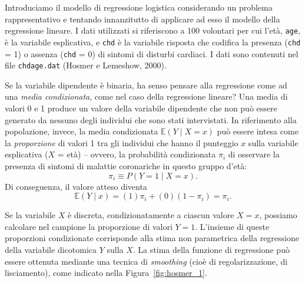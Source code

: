 Introduciamo il modello di regressione logistica considerando un problema rappresentativo e tentando innanzitutto di applicare ad esso il modello della regressione lineare.  
I dati utilizzati si riferiscono a 100 volontari per cui l'età, \texttt{age}, è la variabile esplicativa, e \texttt{chd} è la variabile risposta che codifica la presenza (\texttt{chd} = 1) o assenza (\texttt{chd} = 0) di sintomi di disturbi cardiaci. 
I dati sono contenuti nel file \texttt{chdage.dat} (Hosmer e Lemeshow, 2000).
   
Se la variabile dipendente è binaria, ha senso pensare alla
regressione come ad una \emph{media condizionata}, come nel caso della
regressione lineare? Una media di valori 0 e 1 produce un valore della variabile dipendente che non può essere generato da nessuno degli individui che sono stati intervistati. 
In riferimento alla popolazione, invece, la media condizionata $\mathbb{E}(Y \mid X=x)$ può essere intesa come la \emph{proporzione} di valori 1 tra gli individui che hanno il punteggio $x$ sulla variabile esplicativa ($X$ = età) -- ovvero, la probabilità condizionata $\pi_i$ di osservare la presenza di sintomi di malattie coronariche in questo gruppo d'età:
  \[
  \pi_i \equiv P(Y = 1 \mid X = x).
  \]
Di conseguenza, il valore atteso diventa
  \[
  \mathbb{E}(Y \mid x) = (1) \pi_i + (0) (1-\pi_i) = \pi_i.
  \]

Se la variabile $X$ è discreta, condizionatamente a ciascun valore $X=x$, possiamo  calcolare nel campione la proporzione di valori $Y=1$. 
L'insieme di queste proporzioni condizionate corrisponde alla stima non parametrica della regressione della variabile dicotomica $Y$ sulla $X$. 
La stima della funzione di regressione può essere ottenuta mediante una tecnica di \emph{smoothing} (cioè di regolarizzazione, di lisciamento), come indicato nella Figura~\ref{fig:hosmer_1}.

